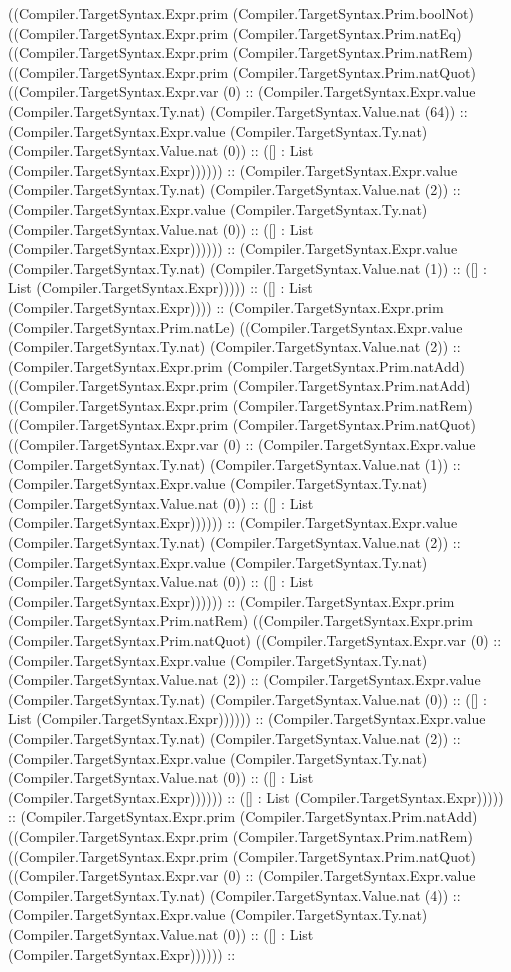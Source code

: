 \documentclass[11pt]{article}
\begin{document}
((Compiler.TargetSyntax.Expr.prim (Compiler.TargetSyntax.Prim.boolNot) ((Compiler.TargetSyntax.Expr.prim (Compiler.TargetSyntax.Prim.natEq) ((Compiler.TargetSyntax.Expr.prim (Compiler.TargetSyntax.Prim.natRem) ((Compiler.TargetSyntax.Expr.prim (Compiler.TargetSyntax.Prim.natQuot) ((Compiler.TargetSyntax.Expr.var (0) :: (Compiler.TargetSyntax.Expr.value (Compiler.TargetSyntax.Ty.nat) (Compiler.TargetSyntax.Value.nat (64)) :: (Compiler.TargetSyntax.Expr.value (Compiler.TargetSyntax.Ty.nat) (Compiler.TargetSyntax.Value.nat (0)) :: ([] : List (Compiler.TargetSyntax.Expr)))))) :: (Compiler.TargetSyntax.Expr.value (Compiler.TargetSyntax.Ty.nat) (Compiler.TargetSyntax.Value.nat (2)) :: (Compiler.TargetSyntax.Expr.value (Compiler.TargetSyntax.Ty.nat) (Compiler.TargetSyntax.Value.nat (0)) :: ([] : List (Compiler.TargetSyntax.Expr)))))) :: (Compiler.TargetSyntax.Expr.value (Compiler.TargetSyntax.Ty.nat) (Compiler.TargetSyntax.Value.nat (1)) :: ([] : List (Compiler.TargetSyntax.Expr))))) :: ([] : List (Compiler.TargetSyntax.Expr)))) :: (Compiler.TargetSyntax.Expr.prim (Compiler.TargetSyntax.Prim.natLe) ((Compiler.TargetSyntax.Expr.value (Compiler.TargetSyntax.Ty.nat) (Compiler.TargetSyntax.Value.nat (2)) :: (Compiler.TargetSyntax.Expr.prim (Compiler.TargetSyntax.Prim.natAdd) ((Compiler.TargetSyntax.Expr.prim (Compiler.TargetSyntax.Prim.natAdd) ((Compiler.TargetSyntax.Expr.prim (Compiler.TargetSyntax.Prim.natRem) ((Compiler.TargetSyntax.Expr.prim (Compiler.TargetSyntax.Prim.natQuot) ((Compiler.TargetSyntax.Expr.var (0) :: (Compiler.TargetSyntax.Expr.value (Compiler.TargetSyntax.Ty.nat) (Compiler.TargetSyntax.Value.nat (1)) :: (Compiler.TargetSyntax.Expr.value (Compiler.TargetSyntax.Ty.nat) (Compiler.TargetSyntax.Value.nat (0)) :: ([] : List (Compiler.TargetSyntax.Expr)))))) :: (Compiler.TargetSyntax.Expr.value (Compiler.TargetSyntax.Ty.nat) (Compiler.TargetSyntax.Value.nat (2)) :: (Compiler.TargetSyntax.Expr.value (Compiler.TargetSyntax.Ty.nat) (Compiler.TargetSyntax.Value.nat (0)) :: ([] : List (Compiler.TargetSyntax.Expr)))))) :: (Compiler.TargetSyntax.Expr.prim (Compiler.TargetSyntax.Prim.natRem) ((Compiler.TargetSyntax.Expr.prim (Compiler.TargetSyntax.Prim.natQuot) ((Compiler.TargetSyntax.Expr.var (0) :: (Compiler.TargetSyntax.Expr.value (Compiler.TargetSyntax.Ty.nat) (Compiler.TargetSyntax.Value.nat (2)) :: (Compiler.TargetSyntax.Expr.value (Compiler.TargetSyntax.Ty.nat) (Compiler.TargetSyntax.Value.nat (0)) :: ([] : List (Compiler.TargetSyntax.Expr)))))) :: (Compiler.TargetSyntax.Expr.value (Compiler.TargetSyntax.Ty.nat) (Compiler.TargetSyntax.Value.nat (2)) :: (Compiler.TargetSyntax.Expr.value (Compiler.TargetSyntax.Ty.nat) (Compiler.TargetSyntax.Value.nat (0)) :: ([] : List (Compiler.TargetSyntax.Expr)))))) :: ([] : List (Compiler.TargetSyntax.Expr))))) :: (Compiler.TargetSyntax.Expr.prim (Compiler.TargetSyntax.Prim.natAdd) ((Compiler.TargetSyntax.Expr.prim (Compiler.TargetSyntax.Prim.natRem) ((Compiler.TargetSyntax.Expr.prim (Compiler.TargetSyntax.Prim.natQuot) ((Compiler.TargetSyntax.Expr.var (0) :: (Compiler.TargetSyntax.Expr.value (Compiler.TargetSyntax.Ty.nat) (Compiler.TargetSyntax.Value.nat (4)) :: (Compiler.TargetSyntax.Expr.value (Compiler.TargetSyntax.Ty.nat) (Compiler.TargetSyntax.Value.nat (0)) :: ([] : List (Compiler.TargetSyntax.Expr)))))) :: 
\end{document}
